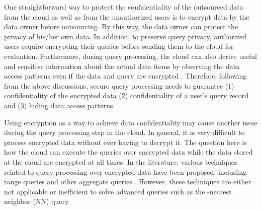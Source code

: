 \documentclass{article}
\begin{document}
One straightforward way to protect the confidentiality of 
the outsourced data from the cloud as well 
as from the unauthorized users is to encrypt data by the data owner before outsourcing\cite{abadi2009data,pearson2009privacy,li2012toward}. 
By this way, the data owner can protect the privacy of his/her own data. 
In addition, to preserve query privacy, authorized users require encrypting their queries before sending them to the cloud for evaluation.
Furthermore, during query processing,
 the cloud can also derive useful and sensitive information 
about the actual data items by observing the data access 
patterns even if the data and query are encrypted \cite{williams2008building,de2012managing}.
Therefore, following from the above discussions, secure query processing needs to guarantee (1) 
confidentiality of the encrypted data (2) 
confidentiality of a user's query record and (3) hiding data access patterns.

Using encryption as a way to achieve data confidentiality may cause another issue
during the query processing step in the cloud. In general, it is very
difficult to process encrypted data without ever having to decrypt it. 
The question here is how the cloud can execute the queries over encrypted data while the data stored at the 
cloud are encrypted at all times.
In the literature, various techniques related to query processing over 
encrypted data have been proposed, including range queries \cite{agrawal2004order,hore2004privacy,shi2007multi, hore2012secure} 
and other aggregate queries \cite{hacigumucs2004efficient,mykletun2006aggregation}.  
However, these techniques are either not applicable or inefficient to solve advanced queries such 
as the -nearest neighbor (NN) query. 
\end{document}
